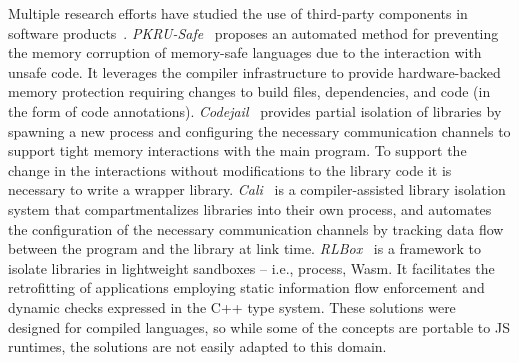 Multiple research efforts have studied the use of third-party
components in software products~\cite{RLBox, kirth2022pkru,
  wu2012codejail, cali}. {\em PKRU-Safe}~\cite{kirth2022pkru} proposes an
automated method for preventing the memory corruption of memory-safe
languages due to the interaction with unsafe code. It leverages the
compiler infrastructure to provide hardware-backed memory protection
requiring changes to build files, dependencies, and code (in the form
of code annotations). {\em Codejail}~\cite{wu2012codejail} provides
partial isolation of libraries by spawning a new process and
configuring the necessary communication channels to support tight
memory interactions with the main program. To support the change in
the interactions without modifications to the library code it is
necessary to write a wrapper library.
{\em Cali}~\cite{cali} is a compiler-assisted library
isolation system that compartmentalizes libraries into their own
process, and automates the configuration of the necessary
communication channels by tracking data flow between the program and
the library at link time.
{\em RLBox}~\cite{RLBox} is a
framework to isolate libraries in lightweight sandboxes -- i.e.,
process, Wasm. It facilitates the retrofitting of applications
employing static information flow enforcement and dynamic checks
expressed in the C++ type system. These solutions were designed for
compiled languages, so while some of the concepts are portable to JS
runtimes, the solutions are not easily adapted to this domain.

